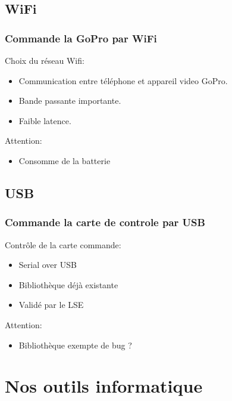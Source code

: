 \documentclass[transparent]{beamer}
\begin{document}
\subsection{WiFi}

\begin{frame}
\frametitle{Commande la GoPro par WiFi}
	\begin{block}{Choix du réseau Wifi:}
			\begin{itemize}
				\item Communication entre téléphone et appareil video GoPro.
				\item Bande passante importante.
				\item Faible latence.
			\end{itemize}
	\end{block}
	\begin{block}{Attention:}
			\begin{itemize}
				\item Consomme de la batterie
			\end{itemize}
	\end{block}
\end{frame}

\subsection{USB}

\begin{frame}
\frametitle{Commande la carte de controle par USB}
	\begin{block}{Contrôle de la carte commande:}
			\begin{itemize}
				\item Serial over USB
				\item Bibliothèque déjà existante
				\item Validé par le LSE
			\end{itemize}
	\end{block}
	\begin{block}{Attention:}
			\begin{itemize}
				\item Bibliothèque exempte de bug ?
			\end{itemize}
	\end{block}
\end{frame}

\section{Nos outils informatique}
\end{document}
